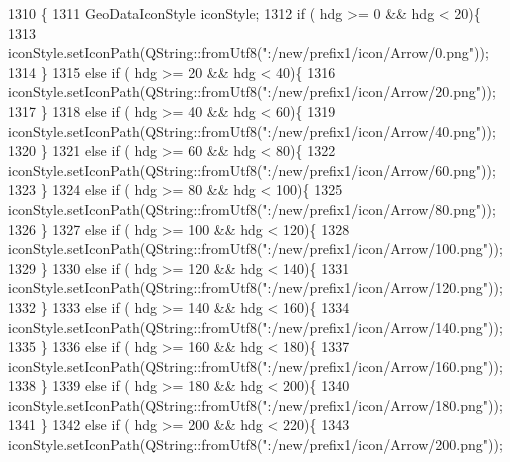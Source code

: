 \begin{DoxyCode}
1310                                                              \{
1311     GeoDataIconStyle iconStyle;
1312     \textcolor{keywordflow}{if} ( hdg >= 0 && hdg < 20)\{
1313         iconStyle.setIconPath(QString::fromUtf8(\textcolor{stringliteral}{":/new/prefix1/icon/Arrow/0.png"}));
1314     \}
1315     \textcolor{keywordflow}{else}  \textcolor{keywordflow}{if} ( hdg >= 20 && hdg < 40)\{
1316          iconStyle.setIconPath(QString::fromUtf8(\textcolor{stringliteral}{":/new/prefix1/icon/Arrow/20.png"}));
1317     \}
1318     \textcolor{keywordflow}{else}  \textcolor{keywordflow}{if} ( hdg >= 40 && hdg < 60)\{
1319          iconStyle.setIconPath(QString::fromUtf8(\textcolor{stringliteral}{":/new/prefix1/icon/Arrow/40.png"}));
1320     \}
1321     \textcolor{keywordflow}{else}  \textcolor{keywordflow}{if} ( hdg >= 60 && hdg < 80)\{
1322          iconStyle.setIconPath(QString::fromUtf8(\textcolor{stringliteral}{":/new/prefix1/icon/Arrow/60.png"}));
1323     \}
1324     \textcolor{keywordflow}{else}  \textcolor{keywordflow}{if} ( hdg >= 80 && hdg < 100)\{
1325          iconStyle.setIconPath(QString::fromUtf8(\textcolor{stringliteral}{":/new/prefix1/icon/Arrow/80.png"}));
1326     \}
1327     \textcolor{keywordflow}{else}  \textcolor{keywordflow}{if} ( hdg >= 100 && hdg < 120)\{
1328          iconStyle.setIconPath(QString::fromUtf8(\textcolor{stringliteral}{":/new/prefix1/icon/Arrow/100.png"}));
1329     \}
1330     \textcolor{keywordflow}{else}  \textcolor{keywordflow}{if} ( hdg >= 120 && hdg < 140)\{
1331          iconStyle.setIconPath(QString::fromUtf8(\textcolor{stringliteral}{":/new/prefix1/icon/Arrow/120.png"}));
1332     \}
1333     \textcolor{keywordflow}{else}  \textcolor{keywordflow}{if} ( hdg >= 140 && hdg < 160)\{
1334          iconStyle.setIconPath(QString::fromUtf8(\textcolor{stringliteral}{":/new/prefix1/icon/Arrow/140.png"}));
1335     \}
1336     \textcolor{keywordflow}{else}  \textcolor{keywordflow}{if} ( hdg >= 160 && hdg < 180)\{
1337          iconStyle.setIconPath(QString::fromUtf8(\textcolor{stringliteral}{":/new/prefix1/icon/Arrow/160.png"}));
1338     \}
1339     \textcolor{keywordflow}{else}  \textcolor{keywordflow}{if} ( hdg >= 180 && hdg < 200)\{
1340          iconStyle.setIconPath(QString::fromUtf8(\textcolor{stringliteral}{":/new/prefix1/icon/Arrow/180.png"}));
1341     \}
1342     \textcolor{keywordflow}{else}  \textcolor{keywordflow}{if} ( hdg >= 200 && hdg < 220)\{
1343          iconStyle.setIconPath(QString::fromUtf8(\textcolor{stringliteral}{":/new/prefix1/icon/Arrow/200.png"}));

\end{DoxyCode}
